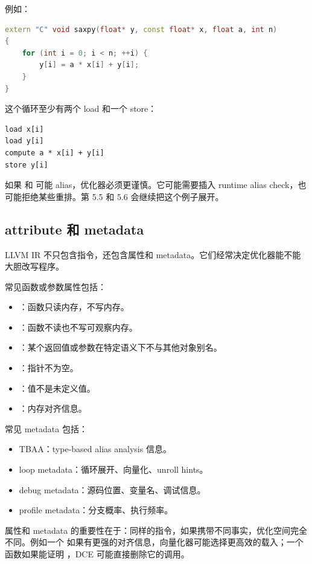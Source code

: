 例如：

\begin{lstlisting}[language=C++]
extern "C" void saxpy(float* y, const float* x, float a, int n)
{
    for (int i = 0; i < n; ++i) {
        y[i] = a * x[i] + y[i];
    }
}
\end{lstlisting}

这个循环至少有两个 load 和一个 store：

\begin{lstlisting}
load x[i]
load y[i]
compute a * x[i] + y[i]
store y[i]
\end{lstlisting}

如果  和  可能 alias，优化器必须更谨慎。它可能需要插入 runtime alias check，也可能拒绝某些重排。第 5.5 和 5.6 会继续把这个例子展开。

\subsection{attribute 和 metadata}

LLVM IR 不只包含指令，还包含属性和 metadata。它们经常决定优化器能不能大胆改写程序。

常见函数或参数属性包括：

\begin{itemize}
  \item {}：函数只读内存，不写内存。
  \item {}：函数不读也不写可观察内存。
  \item {}：某个返回值或参数在特定语义下不与其他对象别名。
  \item {}：指针不为空。
  \item {}：值不是未定义值。
  \item {}：内存对齐信息。
\end{itemize}

常见 metadata 包括：

\begin{itemize}
  \item TBAA：type-based alias analysis 信息。
  \item loop metadata：循环展开、向量化、unroll hints。
  \item debug metadata：源码位置、变量名、调试信息。
  \item profile metadata：分支概率、执行频率。
\end{itemize}

属性和 metadata 的重要性在于：同样的指令，如果携带不同事实，优化空间完全不同。例如一个  如果有更强的对齐信息，向量化器可能选择更高效的载入；一个函数如果能证明 ，DCE 可能直接删除它的调用。

